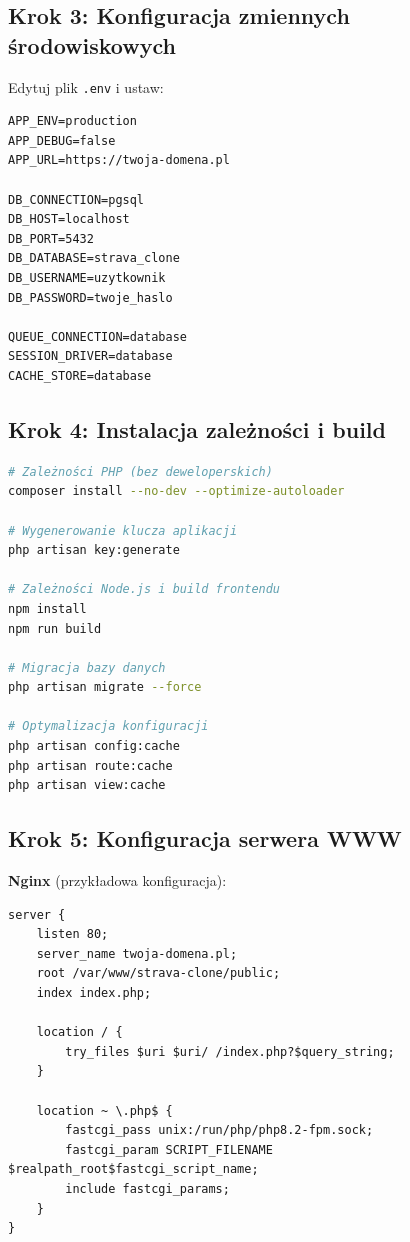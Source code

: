 \documentclass[12pt,a4paper]{report}
\begin{document}
\subsection{Krok 3: Konfiguracja zmiennych środowiskowych}

Edytuj plik \texttt{.env} i ustaw:

\begin{lstlisting}[numbers=none]
APP_ENV=production
APP_DEBUG=false
APP_URL=https://twoja-domena.pl

DB_CONNECTION=pgsql
DB_HOST=localhost
DB_PORT=5432
DB_DATABASE=strava_clone
DB_USERNAME=uzytkownik
DB_PASSWORD=twoje_haslo

QUEUE_CONNECTION=database
SESSION_DRIVER=database
CACHE_STORE=database
\end{lstlisting}

\subsection{Krok 4: Instalacja zależności i build}

\begin{lstlisting}[language=bash, numbers=none]
# Zależności PHP (bez deweloperskich)
composer install --no-dev --optimize-autoloader

# Wygenerowanie klucza aplikacji
php artisan key:generate

# Zależności Node.js i build frontendu
npm install
npm run build

# Migracja bazy danych
php artisan migrate --force

# Optymalizacja konfiguracji
php artisan config:cache
php artisan route:cache
php artisan view:cache
\end{lstlisting}

\subsection{Krok 5: Konfiguracja serwera WWW}

\textbf{Nginx} (przykładowa konfiguracja):

\begin{lstlisting}[numbers=none]
server {
    listen 80;
    server_name twoja-domena.pl;
    root /var/www/strava-clone/public;
    index index.php;

    location / {
        try_files $uri $uri/ /index.php?$query_string;
    }

    location ~ \.php$ {
        fastcgi_pass unix:/run/php/php8.2-fpm.sock;
        fastcgi_param SCRIPT_FILENAME $realpath_root$fastcgi_script_name;
        include fastcgi_params;
    }
}
\end{lstlisting}
\end{document}
